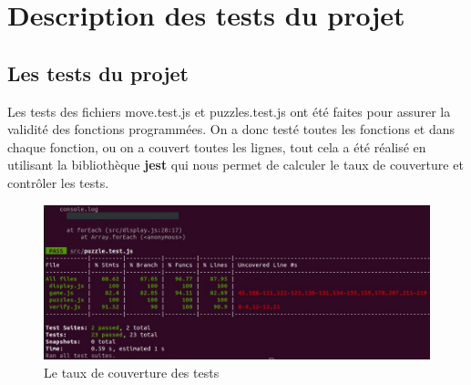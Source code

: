 \documentclass[11pt]{article}
\begin{document}
\section{Description des tests du projet }
\subsection{Les tests du projet}
Les tests des fichiers move.test.js et puzzles.test.js ont été faites pour assurer la validité des fonctions programmées. On a donc testé toutes les fonctions et dans chaque fonction, ou on a couvert toutes les lignes, tout cela a été réalisé en utilisant la bibliothèque \textbf{jest} qui nous permet de calculer le taux de couverture et contr\^oler les tests.
\begin{figure}[h]
    \centering
    \includegraphics[scale=0.5]{ccovrage.jpg}
    \caption{Le taux de couverture des tests}
\end{figure}
\newpage
\end{document}
